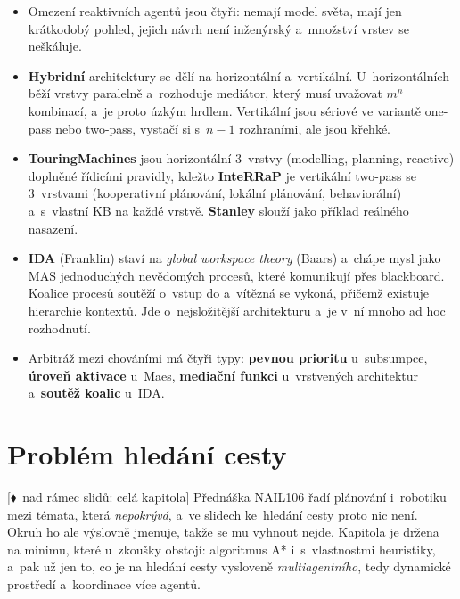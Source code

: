 \documentclass[11pt,a4paper]{article}
\theoremstyle{definition}
\newcommand{\mimoq}[1]{\textcolor{markcol}{\textsf{\footnotesize[$\blacklozenge$~nad rámec slidů: #1]}}}
\begin{document}
\begin{itemize}
  plánování. Moduly mají předpoklady a~efekty (add, delete), aktivace se šíří následnickými,
  předchůdcovskými a~konfliktními spoji a~jejími zdroji jsou stav světa, cíle a~inhibice
  od chráněných cílů. Vybere se proveditelný modul s~nejvyšší aktivací nad prahem a~poměr
  parametrů $\gamma/\phi$ ladí proaktivitu vůči reaktivitě.
\item Omezení reaktivních agentů jsou čtyři: nemají model světa, mají jen krátkodobý pohled,
  jejich návrh není inženýrský a~množství vrstev se neškáluje.
\item \textbf{Hybridní} architektury se dělí na horizontální a~vertikální. U~horizontálních běží
  vrstvy paralelně a~rozhoduje mediátor, který musí uvažovat $m^n$ kombinací, a~je proto úzkým
  hrdlem. Vertikální jsou sériové ve variantě one-pass nebo two-pass, vystačí si s~$n-1$
  rozhraními, ale jsou křehké.
\item \textbf{TouringMachines} jsou horizontální 3~vrstvy (modelling, planning, reactive)
  doplněné řídicími pravidly, kdežto \textbf{InteRRaP} je vertikální two-pass se 3~vrstvami
  (kooperativní plánování, lokální plánování, behaviorální) a~s~vlastní KB na každé vrstvě.
  \textbf{Stanley} slouží jako příklad reálného nasazení.
\item \textbf{IDA} (Franklin) staví na \emph{global workspace theory} (Baars) a~chápe mysl jako
  MAS jednoduchých nevědomých procesů, které komunikují přes blackboard. Koalice procesů soutěží
  o~vstup do  a~vítězná se vykoná, přičemž existuje hierarchie kontextů. Jde
  o~nejsložitější architekturu a~je v~ní mnoho ad hoc rozhodnutí.
\item Arbitráž mezi chováními má čtyři typy: \textbf{pevnou prioritu} u~subsumpce,
  \textbf{úroveň aktivace} u~Maes, \textbf{mediační funkci} u~vrstvených architektur
  a~\textbf{soutěž koalic} u~IDA.
\end{itemize}


\section{Problém hledání cesty}
\label{sec:cesta}

\noindent\mimoq{celá kapitola} Přednáška NAIL106 řadí plánování i~robotiku mezi témata, která
\emph{nepokrývá}, a~ve slidech ke~hledání cesty proto nic není. Okruh ho ale výslovně jmenuje,
takže se mu vyhnout nejde. Kapitola je držena na minimu, které u~zkoušky obstojí:
algoritmus A* i~s~vlastnostmi heuristiky, a~pak už jen to, co je na hledání cesty vysloveně
\emph{multiagentního}, tedy dynamické prostředí a~koordinace více agentů.
\end{document}
